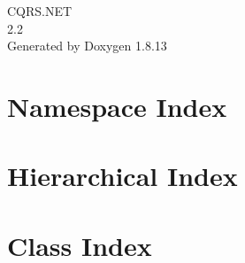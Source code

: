 \documentclass[twoside]{book}
\newcommand{\+}{\discretionary{\mbox{\scriptsize$\hookleftarrow$}}{}{}}
\newcommand{\clearemptydoublepage}{%
  \newpage{\pagestyle{empty}\cleardoublepage}%
}
\begin{document}
\hypersetup{pageanchor=false,
             bookmarksnumbered=true,
             pdfencoding=unicode
            }
\begin{titlepage}
\vspace*{7cm}
\begin{center}%
{\Large C\+Q\+R\+S.\+N\+ET \\[1ex]\large 2.\+2 }\\
\vspace*{1cm}
{\large Generated by Doxygen 1.8.13}\\
\end{center}
\end{titlepage}
\clearemptydoublepage
{}
\tableofcontents
\clearemptydoublepage
{}
\hypersetup{pageanchor=true}

\chapter{Namespace Index}

\chapter{Hierarchical Index}

\chapter{Class Index}

\end{document}
